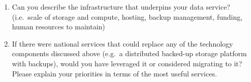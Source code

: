 \documentclass[11pt]{scrartcl}
\begin{document}
\begin{enumerate}
  
\subsection*{Technical Infrastructure and Federation Aspirations}
 \item Can you describe the infrastructure that underpins your data service? (i.e.\ scale of storage and compute, hosting, backup management, funding, human resources to maintain)
 \item If there were national services that could replace any of the technology components discussed above (e.g.\ a distributed backed-up storage platform with backups), would you have leveraged it or considered migrating to it? Please explain your priorities in terms of the most useful services.
\end{enumerate}
\newpage

\printbibliography
\end{document}
